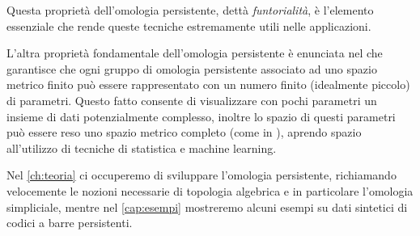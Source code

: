 Questa proprietà dell'omologia persistente, dettà \emph{funtorialità}, è l'elemento essenziale che rende queste tecniche estremamente utili nelle applicazioni.

L'altra proprietà fondamentale dell'omologia persistente è enunciata nel  che garantisce che ogni gruppo di omologia persistente associato ad uno spazio metrico finito può essere rappresentato con un numero finito (idealmente piccolo) di parametri. Questo fatto consente di visualizzare con pochi parametri un insieme di dati potenzialmente complesso, inoltre lo spazio di questi parametri può essere reso uno spazio metrico completo (come in \cite{Kwitt2015}), aprendo spazio all'utilizzo di tecniche di statistica e machine learning.

Nel \cref{ch:teoria} ci occuperemo di sviluppare l'omologia persistente, richiamando velocemente le nozioni necessarie di topologia algebrica e in particolare l'omologia simpliciale, mentre nel \cref{cap:esempi} mostreremo alcuni esempi su dati sintetici di codici a barre persistenti.
